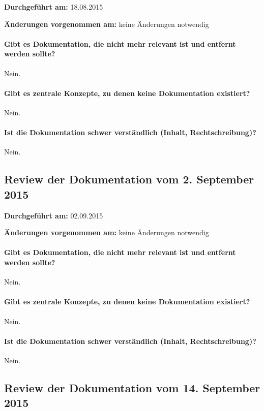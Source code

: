 \textbf{Durchgeführt am:} 18.08.2015

\textbf{Änderungen vorgenommen am:} keine Änderungen notwendig

\paragraph{Gibt es Dokumentation, die nicht mehr relevant ist und entfernt werden sollte?}
Nein.

\paragraph{Gibt es zentrale Konzepte, zu denen keine Dokumentation existiert?}
Nein.

\paragraph{Ist die Dokumentation schwer verständlich (Inhalt, Rechtschreibung)?}
Nein.


\subsection{Review der Dokumentation vom 2. September 2015}

\textbf{Durchgeführt am:} 02.09.2015

\textbf{Änderungen vorgenommen am:} keine Änderungen notwendig

\paragraph{Gibt es Dokumentation, die nicht mehr relevant ist und entfernt werden sollte?}
Nein.

\paragraph{Gibt es zentrale Konzepte, zu denen keine Dokumentation existiert?}
Nein.

\paragraph{Ist die Dokumentation schwer verständlich (Inhalt, Rechtschreibung)?}
Nein.


\subsection{Review der Dokumentation vom 14. September 2015}

